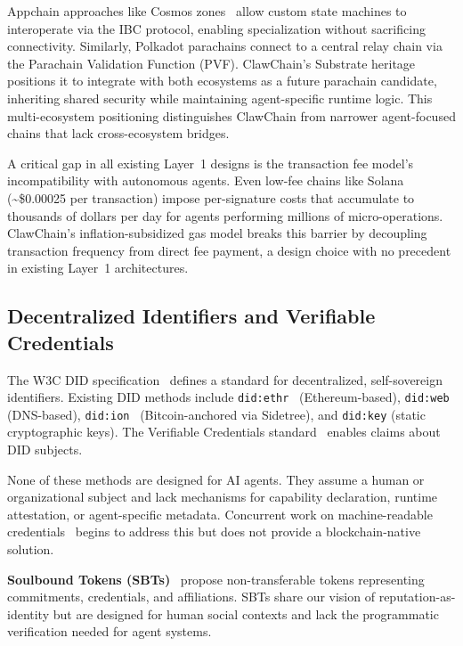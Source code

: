 \documentclass[conference]{IEEEtran}
\begin{document}
Appchain approaches like Cosmos zones~\cite{cosmos_sdk} allow custom state machines to interoperate via the IBC protocol, enabling specialization without sacrificing connectivity. Similarly, Polkadot parachains connect to a central relay chain via the Parachain Validation Function (PVF). ClawChain's Substrate heritage positions it to integrate with both ecosystems as a future parachain candidate, inheriting shared security while maintaining agent-specific runtime logic. This multi-ecosystem positioning distinguishes ClawChain from narrower agent-focused chains that lack cross-ecosystem bridges.

A critical gap in all existing Layer~1 designs is the transaction fee model's incompatibility with autonomous agents. Even low-fee chains like Solana (\textasciitilde\$0.00025 per transaction) impose per-signature costs that accumulate to thousands of dollars per day for agents performing millions of micro-operations. ClawChain's inflation-subsidized gas model breaks this barrier by decoupling transaction frequency from direct fee payment, a design choice with no precedent in existing Layer~1 architectures.

\subsection{Decentralized Identifiers and Verifiable Credentials}

The W3C DID specification~\cite{w3c_did_2022} defines a standard for decentralized, self-sovereign identifiers. Existing DID methods include \texttt{did:ethr}~\cite{did_ethr} (Ethereum-based), \texttt{did:web} (DNS-based), \texttt{did:ion}~\cite{sidetree} (Bitcoin-anchored via Sidetree), and \texttt{did:key} (static cryptographic keys). The Verifiable Credentials standard~\cite{w3c_vc_2022} enables claims about DID subjects.

None of these methods are designed for AI agents. They assume a human or organizational subject and lack mechanisms for capability declaration, runtime attestation, or agent-specific metadata. Concurrent work on machine-readable credentials~\cite{sporny2024vc} begins to address this but does not provide a blockchain-native solution.

\textbf{Soulbound Tokens (SBTs)}~\cite{weyl2022soulbound} propose non-transferable tokens representing commitments, credentials, and affiliations. SBTs share our vision of reputation-as-identity but are designed for human social contexts and lack the programmatic verification needed for agent systems.
\end{document}
